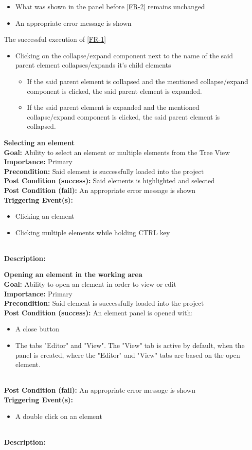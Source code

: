 \documentclass[10pt,a4paper]{report}
\newcommand{\precondition}[1]{
    \textbf{Precondition: } #1 \leavevmode \\
}
\newcommand{\FRDescription}[8]{
    \textbf{#1} \leavevmode \\
    \textbf{Goal: } #2 \leavevmode \\
    \textbf{Importance: } #3 \leavevmode \\
    \precondition{#4}
    \textbf{Post Condition (success): } #5 \leavevmode \\
    \textbf{Post Condition (fail): } #6 \leavevmode \\
    \textbf{Triggering Event(s): } #7 \leavevmode \\
    \textbf{Description: } \leavevmode \\ 
    #8}
\begin{document}
\begin{FR}
{\begin{itemize}
        \item What was shown in the panel before \ref{FR-2} remains unchanged
        \item An appropriate error message is shown
    \end{itemize}}
    {The successful execution of \ref{FR-1}}
    {\begin{itemize}
        \item Clicking on the collapse/expand component next to the name of the said parent element collapses/expands it's child elements
        \begin{itemize}
            \item If the said parent element is collapsed and the mentioned collapse/expand component is clicked, the said parent element is expanded.
            \item If the said parent element is expanded and the mentioned collapse/expand component is clicked, the said parent element is collapsed.
        \end{itemize}
    \end{itemize}}
    \item \FRDescription{Selecting an element}
    {Ability to select an element or multiple elements from the Tree View}
    {Primary}
    {Said element is successfully loaded into the project}
    {Said elements is highlighted and selected}
    {An appropriate error message is shown}
    {\begin{itemize}
                \item Clicking an element
                \item Clicking multiple elements while holding CTRL key
            \end{itemize} }
    \item \FRDescription{Opening an element in the working area}
    {Ability to open an element in order to view or edit}
    {Primary}
    {Said element is successfully loaded into the project}
    {An element panel is opened with:
    \begin{itemize}
        \item A close button 
        \item The tabs "Editor" and "View". The "View" tab is active by default, when the panel is created, where the "Editor" and "View" tabs are based on the open element.
    \end{itemize}}
    {An appropriate error message is shown}
    {\begin{itemize}
        \item A double click on an element

\end{itemize}}
\end{FR}
\end{document}
